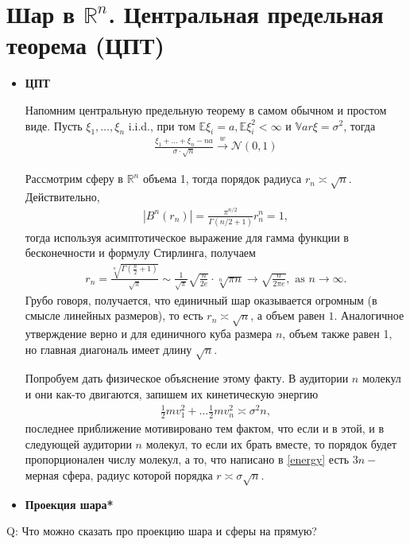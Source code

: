 \documentclass[12pt]{article}
\begin{document}
\section{Шар в $\mathbb{R}^n$. Центральная предельная теорема (ЦПТ)}
\begin{itemize}
\item {\bf ЦПТ}
\par Напомним центральную предельную теорему в самом обычном и простом виде. Пусть $\xi_1, \dots, \xi_n$ i.i.d., при том $\mathbb{E}\xi_i = a, \mathbb{E} \xi^2_i < \infty$ и $\mathbb{V}ar \xi = \sigma^2$, тогда 
\begin{eqnarray}
\frac{\xi_1 + \dots + \xi_n - na}{\sigma \cdot \sqrt{n} } \xrightarrow{w} \mathcal{N}(0, 1)
\end{eqnarray}
\par Рассмотрим сферу в $\mathbb{R}^n$ объема 1, тогда порядок радиуса $r_n \asymp \sqrt{n}$. Действительно, 
\begin{eqnarray}
|B^n(r_n) | = \frac{\pi^{n/2}}{\Gamma(n/2 + 1)} r_n^n= 1, 
\end{eqnarray}
тогда используя асимптотическое выражение для гамма функции в бесконечности и формулу Стирлинга, получаем
\begin{eqnarray}
r_n = \frac {\sqrt[n]{\Gamma\left(\frac n 2 + 1\right)}}{\sqrt{\pi}} \sim \frac 1 {\sqrt{\pi}}{\sqrt{\frac{n}{2e}}} \cdot \sqrt[n]{\pi n} \to \sqrt{\frac{n}{2\pi e}}, {\text { as } } n \to \infty.
\end{eqnarray}
Грубо говоря, получается, что единичный шар оказывается огромным (в смысле линейных размеров), то есть $r_n \asymp \sqrt{n}$, а объем равен $1$. Аналогичное утверждение верно и для единичного куба размера $n$, объем также равен 1, но главная диагональ имеет длину $\sqrt{n}$.
\par Попробуем дать физическое объяснение этому факту. В аудитории $n$ молекул и они как-то двигаются, запишем их кинетическую энергию 
\begin{eqnarray}\label{energy}
\frac 1 2 mv_1^2 + \dots \frac 1 2 {mv_n^2} \asymp \sigma^2 n,
\end{eqnarray}
последнее приближение мотивировано тем фактом, что если и в этой, и в следующей аудитории $n$ молекул, то если их брать вместе, то порядок будет пропорционален числу молекул, а то, что написано в \eqref{energy} есть $3n-$ мерная сфера, радиус которой порядка $r \asymp \sigma \sqrt{n}$.
\item {\bf Проекция шара*}
\end{itemize}
Q: Что можно сказать про проекцию шара и сферы на прямую? 
\end{document}
